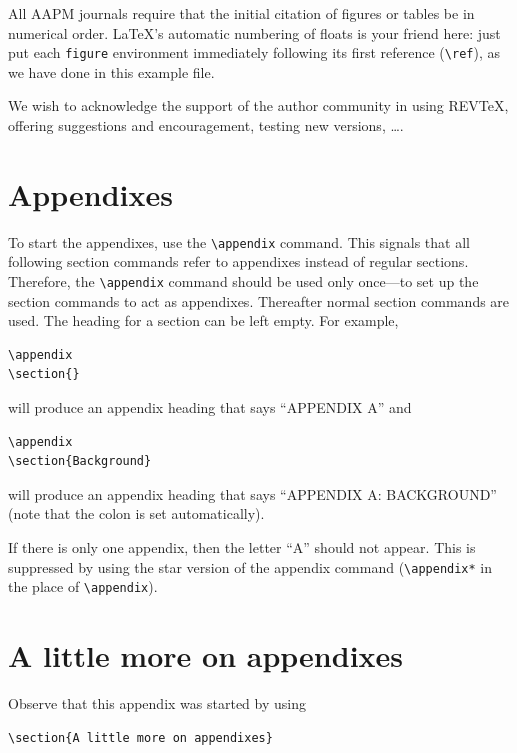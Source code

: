 \documentclass[%
 aapm,
 mph,%
 amsmath,amssymb,
 reprint,%
]{revtex4-2}
\begin{document}
All AAPM journals require that the initial citation of
figures or tables be in numerical order.
\LaTeX's automatic numbering of floats is your friend here:
just put each \texttt{figure} environment immediately following 
its first reference (\verb+\ref+), as we have done in this example file. 

\begin{acknowledgments}
We wish to acknowledge the support of the author community in using
REV\TeX{}, offering suggestions and encouragement, testing new versions,
\dots.
\end{acknowledgments}

\appendix

\section{Appendixes}

To start the appendixes, use the \verb+\appendix+ command.
This signals that all following section commands refer to appendixes
instead of regular sections. Therefore, the \verb+\appendix+ command
should be used only once---to set up the section commands to act as
appendixes. Thereafter normal section commands are used. The heading
for a section can be left empty. For example,
\begin{verbatim}
\appendix
\section{}
\end{verbatim}
will produce an appendix heading that says ``APPENDIX A'' and
\begin{verbatim}
\appendix
\section{Background}
\end{verbatim}
will produce an appendix heading that says ``APPENDIX A: BACKGROUND''
(note that the colon is set automatically).

If there is only one appendix, then the letter ``A'' should not
appear. This is suppressed by using the star version of the appendix
command (\verb+\appendix*+ in the place of \verb+\appendix+).

\section{A little more on appendixes}

Observe that this appendix was started by using
\begin{verbatim}
\section{A little more on appendixes}
\end{verbatim}
\end{document}
